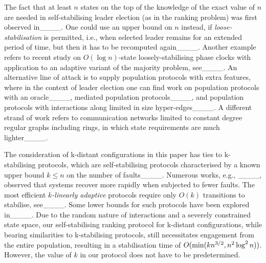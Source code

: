 The fact that at least $n$ states on the top of the knowledge of the exact value of $n$ are needed in self-stabilising leader election (as in the ranking problem) was first observed in____. 
One could use an upper bound on $n$ instead, if {\em loose-stabilisation} is permitted, i.e., when selected leader remains for an extended period of time, but then it has to be recomputed again____.
Another example refers to recent study on $O(\log n)$-state loosely-stabilising phase clocks with application to an adaptive variant of the majority problem, see____. 
An alternative line of attack is to supply population protocols with extra features, where in the context of leader election one can find work on population protocols with an oracle____, mediated population protocols____, and population protocols with interactions along limited in size hyper-edges____. 
A different strand of work refers to communication networks limited to constant degree regular graphs including rings, in which state requirements are much lighter____. 

The consideration of k-distant configurations in this paper has ties to k-stabilising protocols, which are self-stabilising protocols characterised by a known upper bound $k\leq n$ on the number of faults____.
%
Numerous works, e.g., ____, observed that systems 
recover more rapidly when subjected to fewer faults. 
The most efficient {\em $k$-linearly adaptive} protocols require only $O(k)$ transitions to stabilise, see____. 
Some lower bounds for such protocols have been explored in____.
%
Due to the random nature of interactions and a severely constrained state space, our self-stabilising ranking protocol for k-distant configurations, while bearing similarities to k-stabilising protocols, still necessitates engagement from the entire population, resulting in a stabilisation time of $O({\rm\/min}(kn^{3/2},n^2\log^2 n))$. However, the value of $k$ in our protocol does not have to be predetermined.

